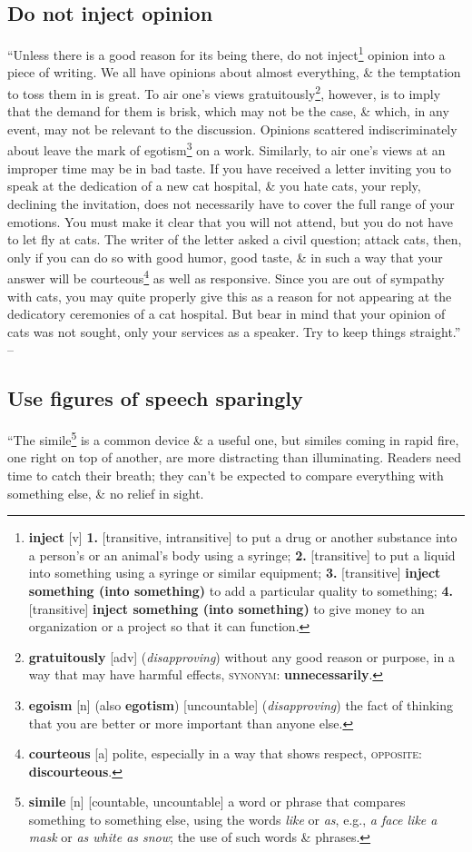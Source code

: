 \documentclass[oneside]{book}
\numberwithin{equation}{section}
\begin{document}
\subsection{Do not inject opinion}
``Unless there is a good reason for its being there, do not inject\footnote{\textbf{inject} [v] \textbf{1.} [transitive, intransitive] to put a drug or another substance into a person's or an animal's body using a syringe; \textbf{2.} [transitive] to put a liquid into something using a syringe or similar equipment; \textbf{3.} [transitive] \textbf{inject something (into something)} to add a particular quality to something; \textbf{4.} [transitive] \textbf{inject something (into something)} to give money to an organization or a project so that it can function.} opinion into a piece of writing. We all have opinions about almost everything, \& the temptation to toss them in is great. To air one's views gratuitously\footnote{\textbf{gratuitously} [adv] (\textit{disapproving}) without any good reason or purpose, in a way that may have harmful effects, \textsc{synonym}: \textbf{unnecessarily}.}, however, is to imply that the demand for them is brisk, which may not be the case, \& which, in any event, may not be relevant to the discussion. Opinions scattered indiscriminately about leave the mark of egotism\footnote{\textbf{egoism} [n] (also \textbf{egotism}) [uncountable] (\textit{disapproving}) the fact of thinking that you are better or more important than anyone else.} on a work. Similarly, to air one's views at an improper time may be in bad taste. If you have received a letter inviting you to speak at the dedication of a new cat hospital, \& you hate cats, your reply, declining the invitation, does not necessarily have to cover the full range of your emotions. You must make it clear that you will not attend, but you do not have to let fly at cats. The writer of the letter asked a civil question; attack cats, then, only if you can do so with good humor, good taste, \& in such a way that your answer will be courteous\footnote{\textbf{courteous} [a] polite, especially in a way that shows respect, \textsc{opposite}: \textbf{discourteous}.} as well as responsive. Since you are out of sympathy with cats, you may quite properly give this as a reason for not appearing at the dedicatory ceremonies of a cat hospital. But bear in mind that your opinion of cats was not sought, only your services as a speaker. Try to keep things straight.'' -- \cite[Chap. 5, Sect. 17, p. 96]{Strunk_White2019}

\subsection{Use figures of speech sparingly}
``The simile\footnote{\textbf{simile} [n] [countable, uncountable] a word or phrase that compares something to something else, using the words \textit{like} or \textit{as}, e.g., \textit{a face like a mask} or \textit{as white as snow}; the use of such words \& phrases.} is a common device \& a useful one, but similes coming in rapid fire, one right on top of another, are more distracting than illuminating. Readers need time to catch their breath; they can't be expected to compare everything with something else, \& no relief in sight.
\end{document}
